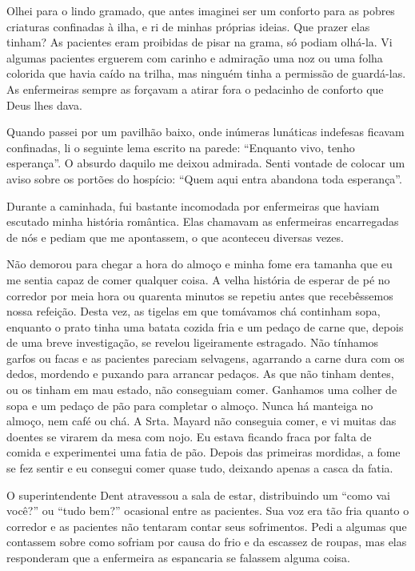 Olhei para o lindo gramado, que antes imaginei ser um conforto para as
pobres criaturas confinadas à ilha, e ri de minhas próprias ideias. Que
prazer elas tinham? As pacientes eram proibidas de pisar na grama, só
podiam olhá-la. Vi algumas pacientes erguerem com carinho e admiração
uma noz ou uma folha colorida que havia caído na trilha, mas ninguém
tinha a permissão de guardá-las. As enfermeiras sempre as forçavam a
atirar fora o pedacinho de conforto que Deus lhes dava.

Quando
passei por um pavilhão baixo, onde inúmeras lunáticas indefesas ficavam
confinadas, li o seguinte lema escrito na parede: ``Enquanto vivo, tenho
esperança''. O absurdo daquilo me deixou admirada. Senti vontade de
colocar um aviso sobre os portões do hospício: ``Quem aqui entra
abandona toda esperança''.

Durante a caminhada, fui bastante incomodada por enfermeiras que haviam
escutado minha história romântica. Elas chamavam as enfermeiras
encarregadas de nós e pediam que me apontassem, o que aconteceu diversas
vezes.

Não demorou para chegar a hora do almoço e minha fome era tamanha que eu
me sentia capaz de comer qualquer coisa. A velha história de esperar de
pé no corredor por meia hora ou quarenta minutos se repetiu antes que
recebêssemos nossa refeição. Desta vez, as tigelas em que tomávamos chá
continham sopa, enquanto o prato tinha uma batata cozida fria e um
pedaço de carne que, depois de uma breve investigação, se revelou
ligeiramente estragado. Não tínhamos garfos ou facas e as pacientes
pareciam selvagens, agarrando a carne dura com os dedos, mordendo e
puxando para arrancar pedaços. As que não tinham dentes, ou os tinham em
mau estado, não conseguiam comer. Ganhamos uma colher de sopa e um
pedaço de pão para completar o almoço. Nunca há manteiga no almoço, nem
café ou chá. A Srta. Mayard não conseguia comer, e vi muitas das doentes
se virarem da mesa com nojo. Eu estava ficando fraca por falta de comida
e experimentei uma fatia de pão. Depois das primeiras mordidas, a fome
se fez sentir e eu consegui comer quase tudo, deixando apenas a casca da
fatia.

O superintendente Dent atravessou a sala de estar, distribuindo um
``como vai você?'' ou ``tudo bem?'' ocasional entre as pacientes. Sua
voz era tão fria quanto o corredor e as pacientes não tentaram contar
seus sofrimentos. Pedi a algumas que contassem sobre como sofriam por
causa do frio e da escassez de roupas, mas elas responderam que a
enfermeira as espancaria se falassem alguma coisa.

